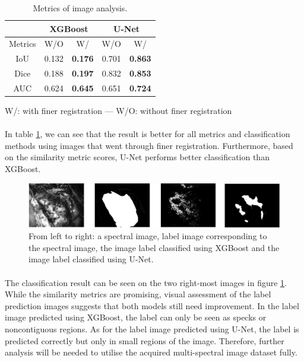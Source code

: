 \documentclass[12pt,oneside]{report}
\begin{document}
\begin{center}
\begin{table}[h]
\centering
\begin{tabular}{ c c c c c } 
 & \multicolumn{2}{c}{XGBoost} & \multicolumn{2}{c}{U-Net} \\
\hline
Metrics & W/O & W/ & W/O & W/ \\
\hline
IoU  & 0.132 & \textbf{0.176} & 0.701 & \textbf{0.863} \\
Dice & 0.188 & \textbf{0.197} & 0.832 & \textbf{0.853} \\
AUC  & 0.624 & \textbf{0.645} & 0.651 & \textbf{0.724} \\
\hline
\end{tabular}

\vspace{0.2cm}
W/: with finer registration --- W/O: without finer registration

\caption{Metrics of image analysis.}
\label{table:finer-reg}
\end{table}
\end{center}

\paragraph{}
In table \ref{table:finer-reg}, we can see that the result is better for all metrics and classification methods using images that went through finer registration. Furthermore, based on the similarity metric scores, U-Net performs better classification than XGBoost.

\begin{figure}[h]
\centering
\begin{minipage}[h]{\textwidth}
    \centering
    \includegraphics[width=\textwidth]{figures/analysis.png}
    \caption{From left to right: a spectral image, label image corresponding to the spectral image, the image label classified using XGBoost and the image label classified using U-Net.}
    \label{fig:analysis}
\end{minipage}
\end{figure}

\paragraph{}
The classification result can be seen on the two right-most images in figure \ref{fig:analysis}. While the similarity metrics are promising, visual assessment of the label prediction images suggests that both models still need improvement. In the label image predicted using XGBoost, the label can only be seen as specks or noncontiguous regions. As for the label image predicted using U-Net, the label is predicted correctly but only in small regions of the image. Therefore, further analysis will be needed to utilise the acquired multi-spectral image dataset fully.
\end{document}
